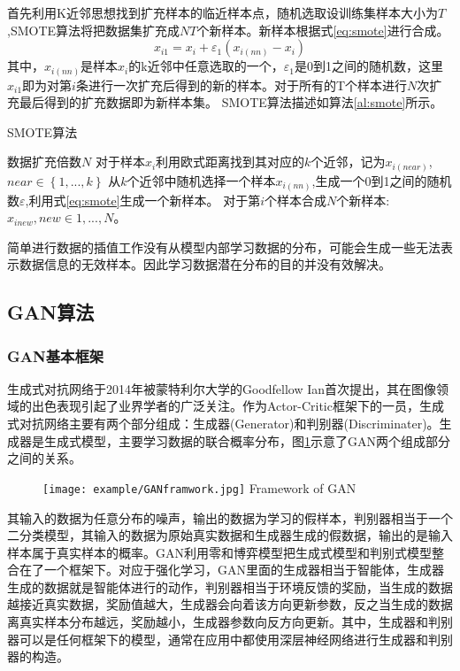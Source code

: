 首先利用K近邻思想找到扩充样本的临近样本点，随机选取设训练集样本大小为$T$,SMOTE算法将把数据集扩充成$NT$个新样本。新样本根据式\ref{eq:smote}进行合成。
\begin{equation}
	\label{eq:smote}
	{x_{i1}} = {x_i} + {\varepsilon _1}({x_{i(nn)}} - {x_i})
\end{equation}
其中，${x_{i(nn)}}$是样本$x_i$的k近邻中任意选取的一个，$\varepsilon _1$是0到1之间的随机数，这里$x_{i1}$即为对第$i$条进行一次扩充后得到的新的样本。对于所有的T个样本进行$N$次扩充最后得到的扩充数据即为新样本集。
SMOTE算法描述如算法\ref{al:smote}所示。

\begin{algorithm}[htbp]
	\caption{SMOTE算法}%
	\label{al:smote}
	\begin{algorithmic}[1]%
		\Require
		数据扩充倍数$N$
		\State 对于样本$x_i$利用欧式距离找到其对应的$k$个近邻，记为${x_{i(near)}}$,$near\in\left\{ {1,...,k} \right\} $
		\State
		从$k$个近邻中随机选择一个样本${x_{i(nn)}}$,生成一个0到1之间的随机数$\varepsilon$,利用式\ref{eq:smote}生成一个新样本。
		\EndFor
		\State 对于第$i$个样本合成$N$个新样本:${x_{inew}},new \in 1,...,N$。
		\EndFor
	\end{algorithmic}
\end{algorithm}
简单进行数据的插值工作没有从模型内部学习数据的分布，可能会生成一些无法表示数据信息的无效样本。因此学习数据潜在分布的目的并没有效解决。

\subsection{GAN算法}
\subsubsection{GAN基本框架}
生成式对抗网络于2014年被蒙特利尔大学的Goodfellow Ian首次提出，其在图像领域的出色表现引起了业界学者的广泛关注。作为Actor-Critic框架下的一员，生成式对抗网络主要有两个部分组成：生成器(Generator)和判别器(Discriminater)。生成器是生成式模型，主要学习数据的联合概率分布，图\ref{fig:GAN2}示意了GAN两个组成部分之间的关系。

\begin{figure}[htbp]
	\centering
	\texttt{[image: example/GANframwork.jpg]}
	{Framework of GAN}
	\label{fig:GAN2}
\end{figure}
其输入的数据为任意分布的噪声，输出的数据为学习的假样本，判别器相当于一个二分类模型，其输入的数据为原始真实数据和生成器生成的假数据，输出的是输入样本属于真实样本的概率。GAN利用零和博弈模型把生成式模型和判别式模型整合在了一个框架下。对应于强化学习，GAN里面的生成器相当于智能体，生成器生成的数据就是智能体进行的动作，判别器相当于环境反馈的奖励，当生成的数据越接近真实数据，奖励值越大，生成器会向着该方向更新参数，反之当生成的数据离真实样本分布越远，奖励越小，生成器参数向反方向更新。其中，生成器和判别器可以是任何框架下的模型，通常在应用中都使用深层神经网络进行生成器和判别器的构造。

